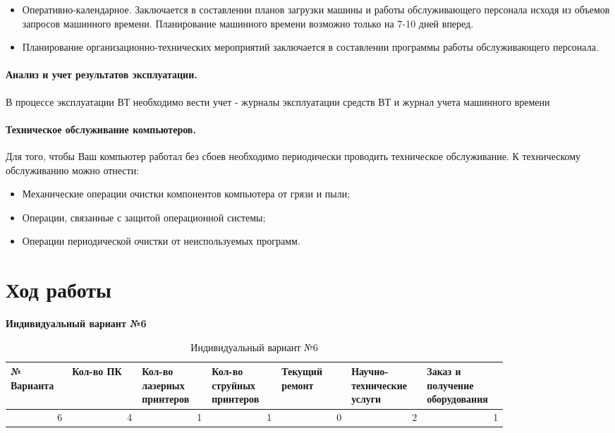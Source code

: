\documentclass[a4paper,14pt]{extarticle}
\begin{document}
\begin{itemize}
\item Оперативно-календарное. Заключается в составлении планов загрузки машины и работы обслуживающего персонала исходя из объемов запросов машинного времени. Планирование машинного времени возможно только на 7-10 дней вперед.

\item Планирование организационно-технических мероприятий заключается в составлении программы работы обслуживающего персонала.

\end{itemize}

\paragraph{Анализ и учет результатов эксплуатации.} В процессе эксплуатации ВТ необходимо вести учет - журналы эксплуатации средств ВТ и журнал учета машинного времени

\paragraph{Техническое обслуживание компьютеров.} Для того, чтобы Ваш компьютер работал без сбоев необходимо периодически проводить техническое обслуживание. К техническому обслуживанию можно отнести:

\begin{itemize}
\item Механические операции очистки компонентов компьютера от грязи и пыли;

\item Операции, связанные с защитой операционной системы;

\item Операции периодической очистки от неиспользуемых программ.
\end{itemize}


\section*{Ход работы}

\textbf{Индивидуальный вариант №6}
\begin{table}[htbp]
	    \caption{Индивидуальный вариант №6}
	\small
	\begin{tabular}{|p{0.1\linewidth}|p{0.12\linewidth}|p{0.12\linewidth}|p{0.12\linewidth}|p{0.12\linewidth}|p{0.12\linewidth}|p{0.12\linewidth}|}
		\hline
		№
		Варианта & Кол-во
		ПК & Кол-во
		лазерных
		принтеров & Кол-во
		струйных
		принтеров & Текущий ремонт & Научно-технические услуги & Заказ и получение оборудования \\ \hline
		\multicolumn{1}{|r|}{6} & \multicolumn{1}{r|}{4} & \multicolumn{1}{r|}{1} & \multicolumn{1}{r|}{1} & \multicolumn{1}{r|}{0} & \multicolumn{1}{r|}{2} & \multicolumn{1}{r|}{1} \\ \hline
	\end{tabular}

	\label{}
\end{table}
\newpage
\end{document}
